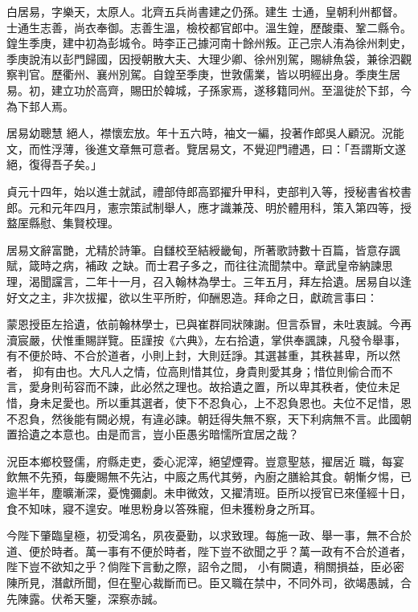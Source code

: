 \begin{pinyinscope}
 白居易，字樂天，太原人。北齊五兵尚書建之仍孫。建生
 士通，皇朝利州都督。士通生志善，尚衣奉御。志善生溫，檢校都官郎中。溫生鍠，歷酸棗、鞏二縣令。鍠生季庚，建中初為彭城令。時李正己據河南十餘州叛。正己宗人洧為徐州刺史，季庚說洧以彭門歸國，因授朝散大夫、大理少卿、徐州別駕，賜緋魚袋，兼徐泗觀察判官。歷衢州、襄州別駕。自鍠至季庚，世敦儒業，皆以明經出身。季庚生居易。初，建立功於高齊，賜田於韓城，子孫家焉，遂移籍同州。至溫徙於下邽，今為下邽人焉。



 居易幼聰慧
 絕人，襟懷宏放。年十五六時，袖文一編，投著作郎吳人顧況。況能文，而性浮薄，後進文章無可意者。覽居易文，不覺迎門禮遇，曰：「吾謂斯文遂絕，復得吾子矣。」



 貞元十四年，始以進士就試，禮部侍郎高郢擢升甲科，吏部判入等，授秘書省校書郎。元和元年四月，憲宗策試制舉人，應才識兼茂、明於體用科，策入第四等，授盩厔縣慰、集賢校理。



 居易文辭富艷，尤精於詩筆。自讎校至結綬畿甸，所著歌詩數十百篇，皆意存諷賦，箴時之病，補政
 之缺。而士君子多之，而往往流聞禁中。章武皇帝納諫思理，渴聞讜言，二年十一月，召入翰林為學士。三年五月，拜左拾遺。居易自以逢好文之主，非次拔擢，欲以生平所貯，仰酬恩造。拜命之日，獻疏言事曰：



 蒙恩授臣左拾遺，依前翰林學士，已與崔群同狀陳謝。但言忝冒，未吐衷誠。今再瀆宸嚴，伏惟重賜詳覽。臣謹按《六典》，左右拾遺，掌供奉諷諫，凡發令舉事，有不便於時、不合於道者，小則上封，大則廷諍。其選甚重，其秩甚卑，所以然者，
 抑有由也。大凡人之情，位高則惜其位，身貴則愛其身；惜位則偷合而不言，愛身則茍容而不諫，此必然之理也。故拾遺之置，所以卑其秩者，使位未足惜，身未足愛也。所以重其選者，使下不忍負心，上不忍負恩也。夫位不足惜，恩不忍負，然後能有闕必規，有違必諫。朝廷得失無不察，天下利病無不言。此國朝置拾遺之本意也。由是而言，豈小臣愚劣暗懦所宜居之哉？



 況臣本鄉校豎儒，府縣走吏，委心泥滓，絕望煙霄。豈意聖慈，擢居近
 職，每宴飲無不先預，每慶賜無不先沾，中廄之馬代其勞，內廚之膳給其食。朝慚夕惕，已逾半年，塵曠漸深，憂愧彌劇。未申微效，又擢清班。臣所以授官已來僅經十日，食不知味，寢不遑安。唯思粉身以答殊寵，但未獲粉身之所耳。



 今陛下肇臨皇極，初受鴻名，夙夜憂勤，以求致理。每施一政、舉一事，無不合於道、便於時者。萬一事有不便於時者，陛下豈不欲聞之乎？萬一政有不合於道者，陛下豈不欲知之乎？倘陛下言動之際，詔令之間，
 小有闕遺，稍關損益，臣必密陳所見，潛獻所聞，但在聖心裁斷而已。臣又職在禁中，不同外司，欲竭愚誠，合先陳露。伏希天鑒，深察赤誠。




\end{pinyinscope}
